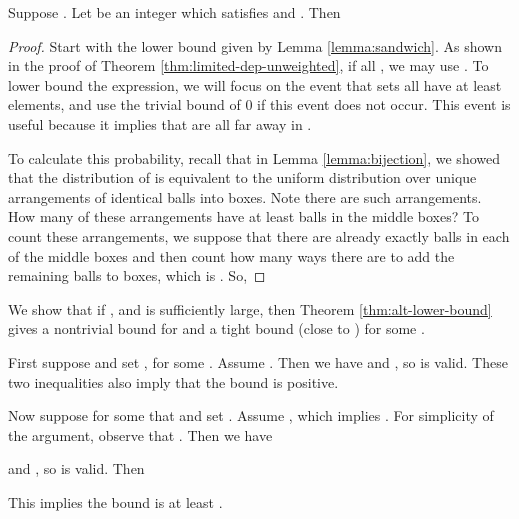 \begin{theorem}\label{thm:alt-lower-bound}
Suppose . Let  be an integer which satisfies  and . Then

\end{theorem}
\begin{proof}
Start with the lower bound given by Lemma \ref{lemma:sandwich}. As shown in the proof of Theorem \ref{thm:limited-dep-unweighted}, if all , we may use . To lower bound the expression, we will focus on the event that sets  all have at least  elements, and use the trivial bound of 0 if this event does not occur. This event is useful because it implies that  are all far away in .

To calculate this probability, recall that in Lemma \ref{lemma:bijection}, we showed that the distribution of  is equivalent to the uniform distribution over unique arrangements of  identical balls into  boxes. Note there are  such arrangements. How many of these arrangements have at least  balls in the middle  boxes? To count these arrangements, we suppose that there are already exactly  balls in each of the middle  boxes and then count how many ways there are to add the remaining  balls to  boxes, which is . So,

\end{proof}

We show that if , and  is sufficiently large, then Theorem \ref{thm:alt-lower-bound} gives a nontrivial bound for  and a tight bound (close to ) for some .

First suppose  and set , for some . Assume . Then we have  and , so  is valid. These two inequalities also imply that the bound is positive.



Now suppose for some  that  and set . 
Assume , which implies . 
For simplicity of the argument, observe that
.
Then we have 
 
and 
, so  is valid. Then

This implies the bound is at least .


